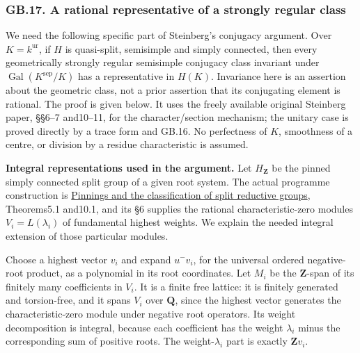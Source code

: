 \documentclass[
  11pt,
]{article}
\begin{document}
\subsubsection{GB.17. A rational representative of a strongly regular
class}\label{gb.17.-a-rational-representative-of-a-strongly-regular-class}

We need the following specific part of Steinberg's conjugacy argument.
Over \(K=k^{\mathrm{ur}}\), if \(H\) is quasi-split, semisimple and
simply connected, then every geometrically strongly regular semisimple
conjugacy class invariant under
\(\operatorname{Gal}(K^{\mathrm{sep}}/K)\) has a representative in
\(H(K)\). Invariance here is an assertion about the geometric class, not
a prior assertion that its conjugating element is rational. The proof is
given below. It uses the freely available original Steinberg paper,
§§6--7 and10--11, for the character/section mechanism; the unitary case
is proved directly by a trace form and GB.16. No perfectness of \(K\),
smoothness of a centre, or division by a residue characteristic is
assumed.

\textbf{Integral representations used in the argument.} Let
\(H_{\mathbf Z}\) be the pinned simply connected split group of a given
root system. The actual programme construction is
\href{../AG-RG/AG-RG-05.html}{Pinnings and the classification of split
reductive groups}, Theorems5.1 and10.1, and its §6 supplies the rational
characteristic-zero modules \(V_i=L(\lambda_i)\) of fundamental highest
weights. We explain the needed integral extension of those particular
modules.

Choose a highest vector \(v_i\) and expand \(u^-v_i\), for the universal
ordered negative-root product, as a polynomial in its root coordinates.
Let \(M_i\) be the \(\mathbf Z\)-span of its finitely many coefficients
in \(V_i\). It is a finite free lattice: it is finitely generated and
torsion-free, and it spans \(V_i\) over \(\mathbf Q\), since the highest
vector generates the characteristic-zero module under negative root
operators. Its weight decomposition is integral, because each
coefficient has the weight \(\lambda_i\) minus the corresponding sum of
positive roots. The weight-\(\lambda_i\) part is exactly
\(\mathbf Z v_i\).
\end{document}

